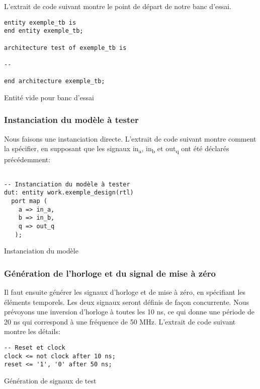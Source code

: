 \documentclass[11pt]{article}
\begin{document}
L'extrait de code suivant montre le point de départ de notre banc
d'essai.

\begin{listing}[htbp]
\begin{verbatim}
entity exemple_tb is
end entity exemple_tb;

architecture test of exemple_tb is

--

end architecture exemple_tb;
\end{verbatim}
\caption{Entité vide pour banc d'essai}
\end{listing}

\subsubsection{Instanciation du modèle à tester}
\label{sec:org6d9a80f}

Nous faisons une instanciation directe. L'extrait de code suivant
montre comment la spécifier, en supposant que les signaux in\textsubscript{a}, in\textsubscript{b}
et out\textsubscript{q} ont été déclarés précédemment:

\begin{listing}[htbp]
\begin{verbatim}

-- Instanciation du modèle à tester 
dut: entity work.exemple_design(rtl)
  port map (
    a => in_a,
    b => in_b,
    q => out_q
   );

\end{verbatim}
\caption{Instanciation du modèle}
\end{listing}

\subsubsection{Génération de l'horloge et du signal de mise à zéro}
\label{sec:org26a6584}

Il faut ensuite générer les signaux d'horloge et de mise à zéro, en
spécifiant les éléments temporels. Les deux signaux seront définis de
façon concurrente. Nous prévoyons une inversion d'horloge à toutes les
10 ns, ce qui donne une période de 20 ns qui correspond à une
fréquence de 50 MHz. L'extrait de code suivant montre les détails:

\begin{listing}[htbp]
\begin{verbatim}
-- Reset et clock
clock <= not clock after 10 ns;
reset <= '1', '0' after 50 ns;
\end{verbatim}
\caption{Génération de signaux de test}
\end{listing}
\end{document}
